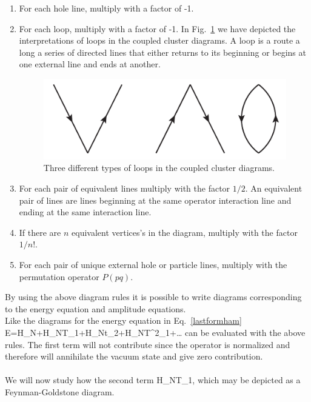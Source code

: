 \begin{enumerate}
\item For each hole line, multiply with a factor of -1.

\item For each loop, multiply with a factor of -1. In Fig.~\ref{loops} we have depicted the interpretations of loops in the coupled cluster diagrams. A loop is a route a long a series of directed lines that either returns to its beginning or begins at one external line and ends at another.
\begin{figure}[htp]
\centering
\includegraphics[scale=0.75]{loops}
\caption{Three different types of loops in the coupled cluster diagrams.}
\label{loops}
\end{figure}

\item For each pair of equivalent lines multiply with the factor $1/2$. An equivalent pair of lines are lines beginning at the same operator interaction line and ending at the same interaction line.

\item If there are $n$ equivalent vertices's in the diagram, multiply
with the factor $1/n!.$

\item For each pair of unique external hole or particle lines, multiply with
 the permutation operator $P(pq).$


\end{enumerate}
By using the above diagram rules it is possible to write diagrams
corresponding to the energy equation and amplitude equations. \\
Like the diagrams for the energy equation in Eq.~\eqref{lastformham}
\be
E=H_N+H_NT_1+H_Nt_2+H_NT^2_1+\dots {}
\ee
can be evaluated with the above rules. The first term will not
contribute since the operator is normalized and therefore will
annihilate the vacuum state and give zero contribution.\\
\\
We will now study how the second term
\be
{}H_NT_1,
\label{firstendi}
\ee
which may be depicted as a Feynman-Goldstone diagram.\\
